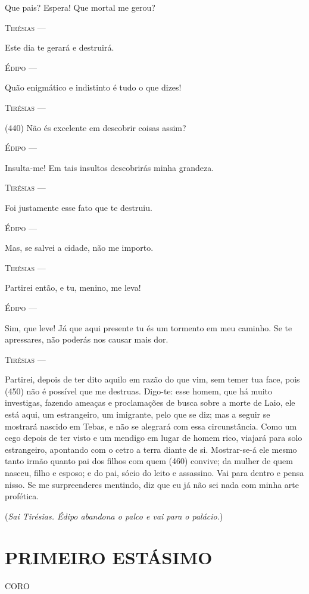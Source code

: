 Que pais? Espera! Que mortal me gerou?

\textsc{Tirésias} ---

Este dia te gerará e destruirá.

\textsc{Édipo} ---

Quão enigmático e indistinto é tudo o que dizes!

\textsc{Tirésias} ---

(440) Não és excelente em descobrir coisas assim?

\textsc{Édipo} ---

Insulta-me! Em tais insultos descobrirás minha grandeza.

\textsc{Tirésias} ---

Foi justamente esse fato que te destruiu.

\textsc{Édipo} ---

Mas, se salvei a cidade, não me importo.

\textsc{Tirésias} ---

Partirei então, e tu, menino, me leva!

\textsc{Édipo} ---

Sim, que leve! Já que aqui presente tu és um tormento em meu caminho. Se
te apressares, não poderás nos causar mais dor.

\textsc{Tirésias} ---

Partirei, depois de ter dito aquilo em razão do que vim, sem temer tua
face, pois (450) não é possível que me destruas. Digo-te: esse homem,
que há muito investigas, fazendo ameaças e proclamações de busca sobre a
morte de Laio, ele está aqui, um estrangeiro, um imigrante, pelo que se
diz; mas a seguir se mostrará nascido em Tebas, e não se alegrará com
essa circunstância. Como um cego depois de ter visto e um mendigo em
lugar de homem rico, viajará para solo estrangeiro, apontando com o
cetro a terra diante de si. Mostrar-se-á ele mesmo tanto irmão quanto
pai dos filhos com quem (460) convive; da mulher de quem nasceu, filho e
esposo; e do pai, sócio do leito e assassino. Vai para dentro e pensa
nisso. Se me surpreenderes mentindo, diz que eu já não sei nada com
minha arte profética.

(\emph{Sai Tirésias. Édipo abandona o palco e vai para o palácio.})

\section{PRIMEIRO ESTÁSIMO}

\textsc{CORO}

